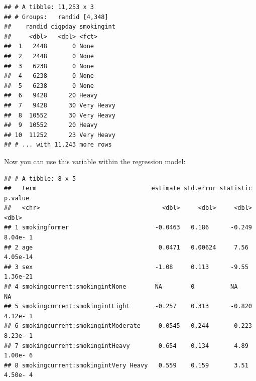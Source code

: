 \documentclass[
]{book}
\newenvironment{Shaded}{\begin{snugshade}}{\end{snugshade}}
\newcommand{\DataTypeTok}[1]{\textcolor[rgb]{0.13,0.29,0.53}{#1}}
\newcommand{\KeywordTok}[1]{\textcolor[rgb]{0.13,0.29,0.53}{\textbf{#1}}}
\newcommand{\NormalTok}[1]{#1}
\newcommand{\OperatorTok}[1]{\textcolor[rgb]{0.81,0.36,0.00}{\textbf{#1}}}
\newcommand{\StringTok}[1]{\textcolor[rgb]{0.31,0.60,0.02}{#1}}
\begin{document}
\begin{Shaded}
\end{Shaded}

\begin{verbatim}
## # A tibble: 11,253 x 3
## # Groups:   randid [4,348]
##    randid cigpday smokingint
##     <dbl>   <dbl> <fct>     
##  1   2448       0 None      
##  2   2448       0 None      
##  3   6238       0 None      
##  4   6238       0 None      
##  5   6238       0 None      
##  6   9428      20 Heavy     
##  7   9428      30 Very Heavy
##  8  10552      30 Very Heavy
##  9  10552      20 Heavy     
## 10  11252      23 Very Heavy
## # ... with 11,243 more rows
\end{verbatim}

Now you can use this variable within the regression model:

\begin{Shaded}
\end{Shaded}

\begin{verbatim}
## # A tibble: 8 x 5
##   term                                estimate std.error statistic   p.value
##   <chr>                                  <dbl>     <dbl>     <dbl>     <dbl>
## 1 smokingformer                        -0.0463   0.186      -0.249  8.04e- 1
## 2 age                                   0.0471   0.00624     7.56   4.05e-14
## 3 sex                                  -1.08     0.113      -9.55   1.36e-21
## 4 smokingcurrent:smokingintNone        NA        0          NA     NA       
## 5 smokingcurrent:smokingintLight       -0.257    0.313      -0.820  4.12e- 1
## 6 smokingcurrent:smokingintModerate     0.0545   0.244       0.223  8.23e- 1
## 7 smokingcurrent:smokingintHeavy        0.654    0.134       4.89   1.00e- 6
## 8 smokingcurrent:smokingintVery Heavy   0.559    0.159       3.51   4.50e- 4
\end{verbatim}
\end{document}
